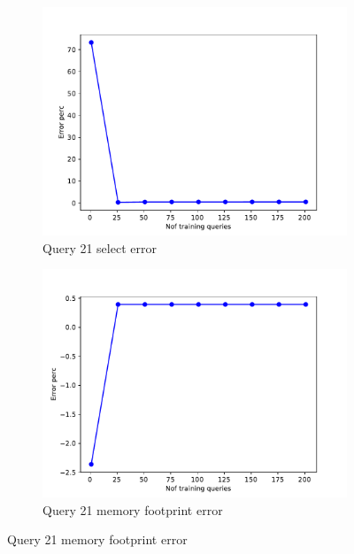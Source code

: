 \begin{figure}[!htb]
     \begin{subfigure}[t]{0.5\textwidth}
       \includegraphics[scale=0.4]{figs/tpch10/tpch10_sel21_error.pdf}
       \caption{Query 21 select error}
       \label{fig:tpch_sel21}
     \end{subfigure}
     \begin{subfigure}[t]{0.5\textwidth}
       \includegraphics[scale=0.4]{figs/tpch10/tpch10_q21_memerror.pdf}
       \caption{Query 21 memory footprint error}
       \label{fig:tpch_mem21}
     \end{subfigure}


\end{figure}
